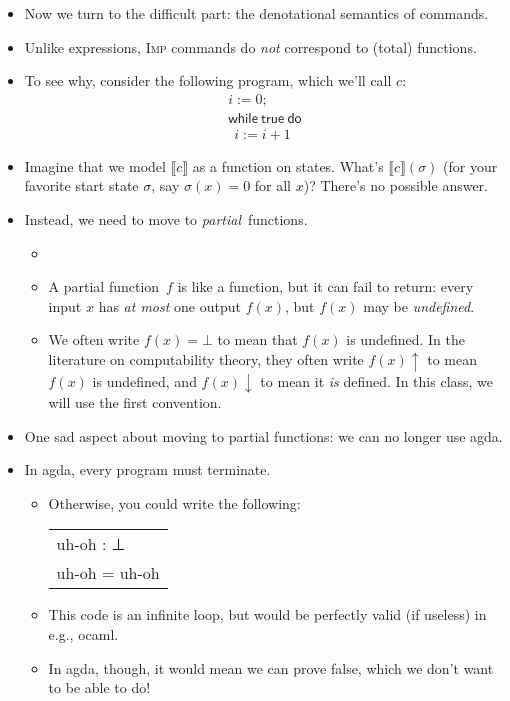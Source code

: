 \documentclass{lecturenotes}
\newcommand{\Imp}{\textsc{Imp}\xspace}
\newcommand{\itrue}{\textsf{true}}
\begin{document}
\begin{itemize}
\item Now we turn to the difficult part: the denotational semantics of commands.
\item Unlike expressions, \Imp commands do \emph{not} correspond to (total) functions.
\item To see why, consider the following program, which we'll call $c$:
  $$\begin{array}{l}
    i := 0;\\
    \textsf{while}~\itrue~\textsf{do}\\
    ~~i := i + 1
  \end{array}$$
\item Imagine that we model $\llbracket c \rrbracket$ as a function on states.
  What's $\llbracket c \rrbracket(\sigma)$ (for your favorite start state $\sigma$, say $\sigma(x) = 0$ for all $x$)?
  There's no possible answer.
\item Instead, we need to move to \emph{partial}~functions.
  \begin{itemize}
  \item \item A partial function~$f$ is like a function, but it can fail to return: every input $x$ has \emph{at most} one output $f(x)$, but $f(x)$ may be \emph{undefined}.
  \item We often write $f(x) = \bot$ to mean that $f(x)$ is undefined.
    In the literature on computability theory, they often write $f(x)\uparrow$ to mean $f(x)$ is undefined, and $f(x)\downarrow$ to mean it \emph{is} defined.
    In this class, we will use the first convention.
  \end{itemize}
\item One sad aspect about moving to partial functions: we can no longer use agda.
\item In agda, every program must terminate.
  \begin{itemize}
  \item Otherwise, you could write the following:
    \begin{tabular}{l}
      \textsf{uh-oh : ⊥}\\
      \textsf{uh-oh = uh-oh}
    \end{tabular}
  \item This code is an infinite loop, but would be perfectly valid (if useless) in e.g., ocaml.
  \item In agda, though, it would mean we can prove false, which we don't want to be able to do!
  \end{itemize}

\end{itemize}
\end{document}
